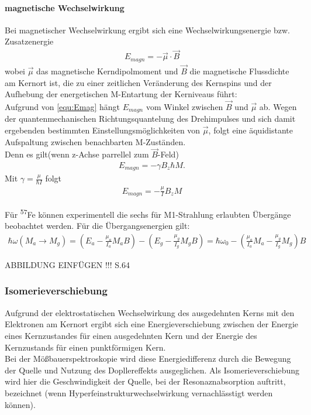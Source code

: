 \documentclass[a4paper,twoside,final]{article}
\begin{document}
\paragraph{magnetische Wechselwirkung}
Bei magnetischer Wechselwirkung ergibt sich eine Wechselwirkungsenergie bzw. Zusatzenergie
\begin{align}\label{equ:Emag}
E_{magn} = - \vec{\mu}\cdot\vec{B}
\end{align}
wobei $\vec{\mu}$ das magnetische Kerndipolmoment und $\vec{B}$ die magnetische Flussdichte am Kernort ist, die zu einer zeitlichen Veränderung des Kernspins und  der Aufhebung der energetischen M-Entartung der Kerniveaus führt:\\
Aufgrund von \ref{equ:Emag} hängt $E_{magn}$ vom Winkel zwischen $\vec{B}$ und $\vec{\mu}$ ab. Wegen der quantenmechanischen Richtungsquantelung des Drehimpulses und sich damit ergebenden bestimmten Einstellungsmöglichkeiten von $\vec{\mu}$, folgt eine äquidistante Aufspaltung zwischen benachbarten M-Zuständen. \\
Denn es gilt(wenn z-Achse parrellel zum $\vec{B}$-Feld)
\begin{align}
E_{magn} = -\gamma B_z \hbar M .
\end{align}
Mit $\gamma = \frac{\mu}{\hbar I}$ folgt
\begin{align}
E_{magn} = - \frac{\mu}{I} B_z M
\end{align}

Für \textsuperscript{57}Fe können experimentell die sechs für M1-Strahlung erlaubten Übergänge beobachtet werden. Für die Übergangsenergien gilt:
\begin{align}
\hbar\omega (M_a \rightarrow M_g) = \left(E_a - \frac{\mu_a} {I_a} M_a B \right) - \left(E_g - \frac{\mu_g} {I_g} M_g B \right)  = \hbar\omega_0 - \left(\frac{\mu_a }{I_a} M_a - \frac{\mu_g}{I_g} M_g\right) B
\end{align}

ABBILDUNG EINFÜGEN !!! S.64

\subsubsection{Isomerieverschiebung}
Aufgrund der elektrostatischen Wechselwirkung des ausgedehnten Kerns mit den Elektronen am Kernort ergibt sich eine Energieverschiebung zwischen der Energie eines Kernzustandes für einen ausgedehnten Kern und der Energie des Kernzustands für einen punktförmigen Kern. \\
Bei der Mößbauerspektroskopie wird diese Energiedifferenz durch die Bewegung der Quelle und Nutzung des Dopllereffekts ausgeglichen. Als Isomerieverschiebung wird hier die Geschwindigkeit der Quelle, bei der Resonaznabsorption auftritt, bezeichnet (wenn Hyperfeinstrukturwechselwirkung vernachlässtigt werden können).
\end{document}
